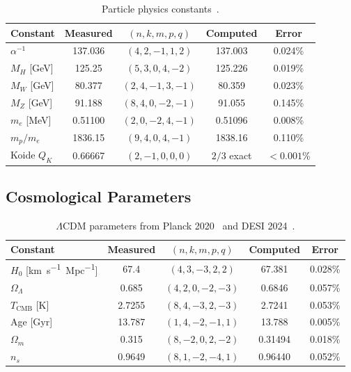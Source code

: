 \documentclass[aps,prd,preprint,superscriptaddress,showpacs,nofootinbib,longbibliography]{revtex4-2}
\begin{document}
\begin{table}[h]
\centering
\small
\begin{tabular}{@{}lcccc@{}}
\toprule
\textbf{Constant} & \textbf{Measured} & $(n,k,m,p,q)$ & \textbf{Computed} & \textbf{Error} \\
\midrule
$\alpha^{-1}$ & 137.036 & $(4,2,-1,1,2)$ & 137.003 & 0.024\% \\
$M_H$ [\si{GeV}] & 125.25 & $(5,3,0,4,-2)$ & 125.226 & 0.019\% \\
$M_W$ [\si{GeV}] & 80.377 & $(2,4,-1,3,-1)$ & 80.359 & 0.023\% \\
$M_Z$ [\si{GeV}] & 91.188 & $(8,4,0,-2,-1)$ & 91.055 & 0.145\% \\
$m_e$ [\si{MeV}] & 0.51100 & $(2,0,-2,4,-1)$ & 0.51096 & 0.008\% \\
$m_p/m_e$ & 1836.15 & $(9,4,0,4,-1)$ & 1838.16 & 0.110\% \\
Koide $Q_K$ & 0.66667 & $(2,-1,0,0,0)$ & $2/3$ exact & $<0.001$\% \\
\bottomrule
\end{tabular}
\caption{Particle physics constants~\cite{pdg2024}.}
\label{tab:particle}
\end{table}

\subsection{Cosmological Parameters}

\begin{table}[h]
\centering
\small
\begin{tabular}{@{}lcccc@{}}
\toprule
\textbf{Constant} & \textbf{Measured} & $(n,k,m,p,q)$ & \textbf{Computed} & \textbf{Error} \\
\midrule
$H_0$ [\si{km.s^{-1}.Mpc^{-1}}] & 67.4 & $(4,3,-3,2,2)$ & 67.381 & 0.028\% \\
$\Omega_\Lambda$ & 0.685 & $(4,2,0,-2,-3)$ & 0.6846 & 0.057\% \\
$T_\text{CMB}$ [\si{K}] & 2.7255 & $(8,4,-3,2,-3)$ & 2.7241 & 0.053\% \\
Age [\si{Gyr}] & 13.787 & $(1,4,-2,-1,1)$ & 13.788 & 0.005\% \\
$\Omega_m$ & 0.315 & $(8,-2,0,2,-2)$ & 0.31494 & 0.018\% \\
$n_s$ & 0.9649 & $(8,1,-2,-4,1)$ & 0.96440 & 0.052\% \\
\bottomrule
\end{tabular}
\caption{$\Lambda$CDM parameters from Planck 2020~\cite{planck2020} and DESI 2024~\cite{desi2024}.}
\label{tab:cosmo}
\end{table}
\end{document}

